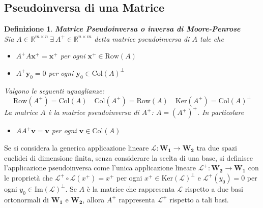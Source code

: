 \documentclass[11pt]{article}
\newtheorem{definition}{Definizione}
\newcommand{\R}{\mathbb{R}}
\begin{document}
\subsection{Pseudoinversa di una Matrice}
\begin{definition}\label{psuedo}
\textbf{Matrice Pseudoinversa o inversa di Moore-Penrose}\\
Sia $A \in \R^{m \times n} \ \exists \ A^+ \in \R^{n \times m}$ detta matrice pseudoinversa di $A$ tale che
\begin{itemize}
	\item $A^+A\mathbf{x}^+=\mathbf{x}^+$ per ogni $\mathbf{x}^+ \in \text{Row}(A)$
	\item $A^+\mathbf{y}_0=0$ per ogni $\mathbf{y}_0 \in \text{Col}(A)^\perp $
\end{itemize}  
Valgono le seguenti uguaglianze:
$$ \text{Row}(A^+)=\text{Col}(A) \quad \text{Col}(A^+)=\text{Row}(A) \quad \text{Ker}(A^+)=\text{Col}(A)^\perp$$
La matrice $A$ è la matrice pseudoinversa di $A^+$: $A=(A^+)^+$. In particolare
\begin{itemize}
	\item $AA^+\mathbf{v}=\mathbf{v}$ per ogni $\mathbf{v} \in \text{Col}(A)$
\end{itemize}
\end{definition}
\noindent
Se si considera la generica applicazione lineare $\mathscr{L}: \mathbf{W_1} \rightarrow \mathbf{W_2}$ tra due spazi euclidei di dimensione finita, senza considerare la scelta di una base, si definisce l'applicazione pseudoinversa come l'unica applicazione lineare $\mathscr{L}^+: \mathbf{W_2} \rightarrow \mathbf{W_1}$ con le proprietà che $\mathscr{L}^+ \circ \mathscr{L} (x^+) = x^+$ per ogni $x^+ \in \text{Ker}(\mathscr{L})^\perp$ e $\mathscr{L}^+(y_0)=0$ per ogni $y_0 \in \text{Im}(\mathscr{L})^\perp$. Se $A$ è la matrice che rappresenta $\mathscr{L}$ rispetto a due basi ortonormali di $\mathbf{W_1}$ e $\mathbf{W_2}$, allora $A^+$ rappresenta $\mathscr{L}^+$ rispetto a tali basi.
\end{document}
